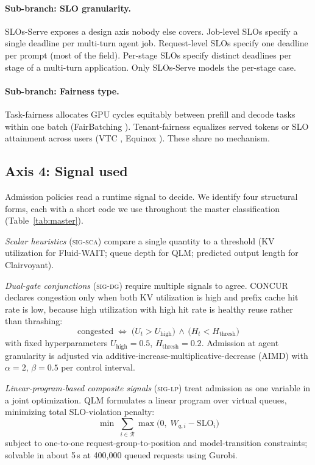 \documentclass[11pt,letterpaper]{article}
\theoremstyle{definition}
\begin{document}
\paragraph{Sub-branch: SLO granularity.}
SLOs-Serve \cite{chen2025slosserve} exposes a design axis nobody else
covers. Job-level SLOs specify a single deadline per multi-turn agent
job. Request-level SLOs specify one deadline per prompt (most of the
field). Per-stage SLOs specify distinct deadlines per stage of a
multi-turn application. Only SLOs-Serve models the per-stage case.

\paragraph{Sub-branch: Fairness type.}
Task-fairness allocates GPU cycles equitably between prefill and
decode tasks within one batch (FairBatching
\cite{lyu2025fairbatching}). Tenant-fairness equalizes served tokens
or SLO attainment across users (VTC \cite{sheng2024vtc}, Equinox
\cite{lu2025equinox}). These share no mechanism.

\subsection{Axis 4: Signal used}

Admission policies read a runtime signal to decide. We identify four
structural forms, each with a short code we use throughout the master
classification (Table~\ref{tab:master}).

\textit{Scalar heuristics} (\textsc{sig-sca}) compare a single quantity
to a threshold (KV utilization for Fluid-WAIT; queue depth for QLM;
predicted output length for Clairvoyant).

\textit{Dual-gate conjunctions} (\textsc{sig-dg}) require multiple
signals to agree.
CONCUR declares congestion only when both KV utilization is high and
prefix cache hit rate is low, because high utilization with high hit
rate is healthy reuse rather than thrashing:
%
\begin{equation}
\text{congested} \;\iff\; \bigl(U_t > U_{\text{high}}\bigr) \,\wedge\, \bigl(H_t < H_{\text{thresh}}\bigr)
\label{eq:concur-dualgate}
\end{equation}
%
with fixed hyperparameters $U_{\text{high}} = 0.5$,
$H_{\text{thresh}} = 0.2$. Admission at agent granularity is adjusted
via additive-increase-multiplicative-decrease (AIMD) with $\alpha = 2$,
$\beta = 0.5$ per control interval.

\textit{Linear-program-based composite signals} (\textsc{sig-lp}) treat
admission as one variable in a joint optimization. QLM formulates a linear program over
virtual queues, minimizing total SLO-violation penalty:
%
\begin{equation}
\min \; \sum_{i \in \mathcal{R}} \max\bigl(0,\; W_{q,i} - \mathrm{SLO}_i\bigr)
\label{eq:qlm-lp}
\end{equation}
%
subject to one-to-one request-group-to-position and model-transition
constraints; solvable in about 5\,s at 400{,}000 queued requests using
Gurobi.
\end{document}

